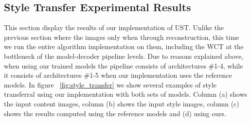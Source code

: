 
\subsection{Style Transfer Experimental Results}
This section display the results of our implementation of UST\cite{bib11}. Unlike the previous section where the images only when through reconstruction, this time we run the entire algorithm implementation on them, including the WCT at the bottleneck of the model-decoder pipeline levels. Due to reasons explained above, when using our trained models the pipeline consists of architectures \#1-4, while it consists of architectures \#1-5 when our implementation uses the reference models. In figure ~\ref{fig:style_transfer} we show several examples of style transferral using our implementation with both sets of models. Column (a) shows the input content images, column (b) shows the input style images, column (c) shows the results computed using the reference models and (d) using ours.\\

